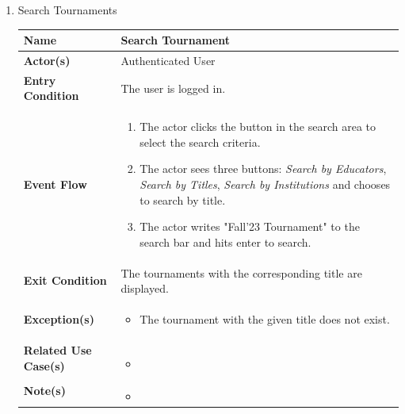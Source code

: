 \begin{enumerate}
\item Search Tournaments
\begin{center}
    \begin{tabular}{ | m{10em} | m{10cm}| } 
      \hline
      \textbf{Name} & Search Tournament  \\ 
      \hline
      \textbf{Actor(s)} & Authenticated User \\ 
      \hline
      \textbf{Entry Condition} & The user is logged in. \\ 
      \hline
      \textbf{Event Flow} & 
          \begin{enumerate}[(1)]
              \item The actor clicks the button in the search area to select the search criteria.
              \item The actor sees three buttons: \textit{Search by Educators}, \textit{Search by Titles}, \textit{Search by Institutions} and chooses to search by title.
              \item The actor writes "Fall'23 Tournament" to the search bar and hits enter to search.
          \end{enumerate}
      \\ 
      \hline
      \textbf{Exit Condition} & The tournaments with the corresponding title are displayed.  \\ 
      \hline
      \textbf{Exception(s)} & 
      \begin{itemize}
          \item The tournament with the given title does not exist.
      \end{itemize}
          \\ 
      \hline
      \textbf{Related Use Case(s)} & 
      \begin{itemize}
          \item 
      \end{itemize}
          \\ 
      \hline
      \textbf{Note(s)} & 
      \begin{itemize}
          \item 
      \end{itemize}
          \\ 
      \hline
    \end{tabular}
\end{center}



\end{enumerate}
